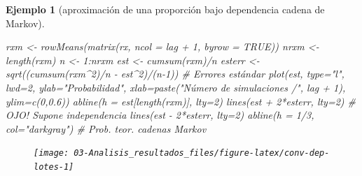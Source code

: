 \documentclass[
]{book}
\newenvironment{Shaded}{\begin{snugshade}}{\end{snugshade}}
\newcommand{\AttributeTok}[1]{\textcolor[rgb]{0.77,0.63,0.00}{#1}}
\newcommand{\CommentTok}[1]{\textcolor[rgb]{0.56,0.35,0.01}{\textit{#1}}}
\newcommand{\ConstantTok}[1]{\textcolor[rgb]{0.00,0.00,0.00}{#1}}
\newcommand{\DecValTok}[1]{\textcolor[rgb]{0.00,0.00,0.81}{#1}}
\newcommand{\FloatTok}[1]{\textcolor[rgb]{0.00,0.00,0.81}{#1}}
\newcommand{\FunctionTok}[1]{\textcolor[rgb]{0.00,0.00,0.00}{#1}}
\newcommand{\NormalTok}[1]{#1}
\newcommand{\OtherTok}[1]{\textcolor[rgb]{0.56,0.35,0.01}{#1}}
\newcommand{\SpecialCharTok}[1]{\textcolor[rgb]{0.00,0.00,0.00}{#1}}
\newcommand{\StringTok}[1]{\textcolor[rgb]{0.31,0.60,0.02}{#1}}
\theoremstyle{break}
\newtheorem{example}{Ejemplo}[chapter]
\theoremstyle{nonumberplain}
\begin{document}
\begin{example}[aproximación de una proporción bajo dependencia cadena de Markov]
\begin{Shaded}
\begin{Highlighting}[]
\NormalTok{rxm }\OtherTok{\textless{}{-}} \FunctionTok{rowMeans}\NormalTok{(}\FunctionTok{matrix}\NormalTok{(rx, }\AttributeTok{ncol =}\NormalTok{ lag }\SpecialCharTok{+} \DecValTok{1}\NormalTok{, }\AttributeTok{byrow =} \ConstantTok{TRUE}\NormalTok{))}
\NormalTok{nrxm }\OtherTok{\textless{}{-}} \FunctionTok{length}\NormalTok{(rxm)}
\NormalTok{n }\OtherTok{\textless{}{-}} \DecValTok{1}\SpecialCharTok{:}\NormalTok{nrxm}
\NormalTok{est }\OtherTok{\textless{}{-}} \FunctionTok{cumsum}\NormalTok{(rxm)}\SpecialCharTok{/}\NormalTok{n}
\NormalTok{esterr }\OtherTok{\textless{}{-}} \FunctionTok{sqrt}\NormalTok{((}\FunctionTok{cumsum}\NormalTok{(rxm}\SpecialCharTok{\^{}}\DecValTok{2}\NormalTok{)}\SpecialCharTok{/}\NormalTok{n }\SpecialCharTok{{-}}\NormalTok{ est}\SpecialCharTok{\^{}}\DecValTok{2}\NormalTok{)}\SpecialCharTok{/}\NormalTok{(n}\DecValTok{{-}1}\NormalTok{)) }\CommentTok{\# Errores estándar}
\FunctionTok{plot}\NormalTok{(est, }\AttributeTok{type=}\StringTok{"l"}\NormalTok{, }\AttributeTok{lwd=}\DecValTok{2}\NormalTok{, }\AttributeTok{ylab=}\StringTok{"Probabilidad"}\NormalTok{, }
     \AttributeTok{xlab=}\FunctionTok{paste}\NormalTok{(}\StringTok{"Número de simulaciones /"}\NormalTok{, lag }\SpecialCharTok{+} \DecValTok{1}\NormalTok{), }\AttributeTok{ylim=}\FunctionTok{c}\NormalTok{(}\DecValTok{0}\NormalTok{,}\FloatTok{0.6}\NormalTok{))}
\FunctionTok{abline}\NormalTok{(}\AttributeTok{h =}\NormalTok{ est[}\FunctionTok{length}\NormalTok{(rxm)], }\AttributeTok{lty=}\DecValTok{2}\NormalTok{)}
\FunctionTok{lines}\NormalTok{(est }\SpecialCharTok{+} \DecValTok{2}\SpecialCharTok{*}\NormalTok{esterr, }\AttributeTok{lty=}\DecValTok{2}\NormalTok{) }\CommentTok{\# OJO! Supone independencia}
\FunctionTok{lines}\NormalTok{(est }\SpecialCharTok{{-}} \DecValTok{2}\SpecialCharTok{*}\NormalTok{esterr, }\AttributeTok{lty=}\DecValTok{2}\NormalTok{)}
\FunctionTok{abline}\NormalTok{(}\AttributeTok{h =} \DecValTok{1}\SpecialCharTok{/}\DecValTok{3}\NormalTok{, }\AttributeTok{col=}\StringTok{"darkgray"}\NormalTok{)     }\CommentTok{\# Prob. teor. cadenas Markov}
\end{Highlighting}
\end{Shaded}

\begin{figure}[!htb]

{\centering \texttt{[image: 03-Analisis\_resultados\_files/figure-latex/conv-dep-lotes-1]} 

}


\end{figure}
\end{example}
\end{document}
